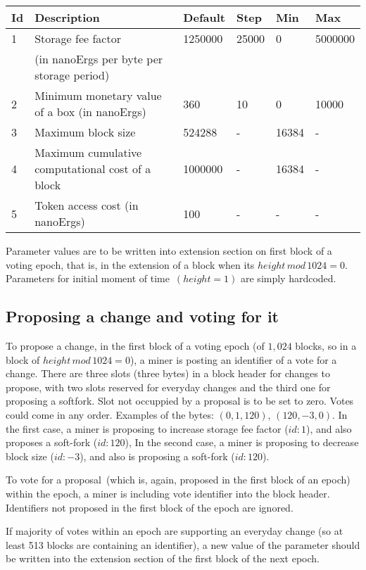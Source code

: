\begin{tabular}{| l | l | l | l | l | l |}
\hline
Id & Description & Default & Step & Min & Max \\
\hline
\hline
1 & Storage fee factor  & 1250000 & 25000 & 0 & 5000000 \\
  &  (in nanoErgs per byte per storage period) & & & & \\
\hline
2 & Minimum monetary value of a box (in nanoErgs) & 360 & 10 & 0 & 10000 \\
\hline
3 & Maximum block size & 524288 & - & 16384 & - \\
\hline
4 & Maximum cumulative computational cost of a block & 1000000 & - & 16384 & - \\
\hline
5 & Token access cost (in nanoErgs) & 100 & - & - & - \\
\hline
\end{tabular}

Parameter values are to be written into extension section on first block of a voting epoch,
that is, in the extension of a block when its $height\,mod\,1024 = 0$.
Parameters for initial moment of time~$(height = 1)$ are simply hardcoded.

\subsection{Proposing a change and voting for it}

To propose a change, in the first block of a voting epoch (of $1,024$ blocks, so in a block of
$height\,mod\,1024 = 0$), a miner is posting an identifier of a vote for a change. There are three slots (three bytes)
in a block header for changes to propose, with two slots reserved for everyday changes and the third one for
proposing a softfork. Slot not occuppied by a proposal is to be set to zero. Votes could come in any order.
Examples of the bytes: $(0, 1, 120)$, $(120, -3, 0)$. In the first case, a miner is proposing to increase storage fee factor ($id:1$), and
also proposes a soft-fork ($id:120$), In the second case, a miner is proposing to decrease block size ($id:-3$), and also
 is proposing a soft-fork ($id:120$).

To vote for a proposal~(which is, again, proposed in the first block of an epoch) within the epoch, a miner is including vote identifier
into the block header. Identifiers not proposed in the first block of the epoch are ignored.

If majority of votes within an epoch are supporting an everyday change (so at least 513 blocks are containing an
identifier), a new value of the parameter should be written into the extension section of the first block of the next
epoch.

